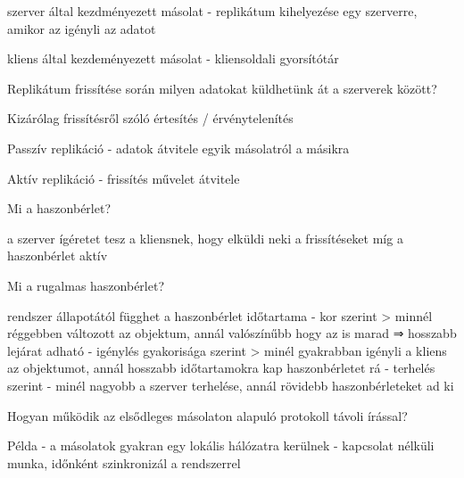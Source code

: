 \documentclass[12pt]{article}
\begin{document}
\begin{description}
                                    \item szerver által kezdményezett másolat
                                        - replikátum kihelyezése egy szerverre, amikor az igényli az adatot
                                    \item kliens által kezdeményezett másolat
                                        - kliensoldali gyorsítótár
                                    \item  Replikátum frissítése során milyen adatokat küldhetünk át a szerverek között?
                                    \item Kizárólag frissítésről szóló értesítés / érvénytelenítés
                                    \item Passzív replikáció
                                        - adatok átvitele egyik másolatról a másikra
                                    \item Aktív replikáció
                                        - frissítés művelet átvitele
                                    \item  Mi a haszonbérlet?	
                                    \item a szerver ígéretet tesz a kliensnek, hogy elküldi neki a frissítéseket míg a haszonbérlet aktív
                                    \item  Mi a rugalmas haszonbérlet?
                                    \item rendszer állapotától függhet a haszonbérlet időtartama
                                        - kor szerint 
                                        > minnél réggebben változott az objektum, annál valószínűbb hogy az is marad 
                                        ⇒ hosszabb lejárat adható
                                        - igénylés gyakorisága szerint
                                        > minél gyakrabban igényli a kliens az objektumot, annál hosszabb időtartamokra kap haszonbérletet rá
                                        - terhelés szerint
                                        - minél nagyobb a szerver terhelése, annál rövidebb haszonbérleteket ad ki 
                                    \item  Hogyan működik az elsődleges másolaton alapuló protokoll távoli írással?	
                                    \item Példa
                                        - a másolatok gyakran egy lokális hálózatra kerülnek
                                        - kapcsolat nélküli munka, időnként szinkronizál a rendszerrel	

\end{description}
\end{document}

